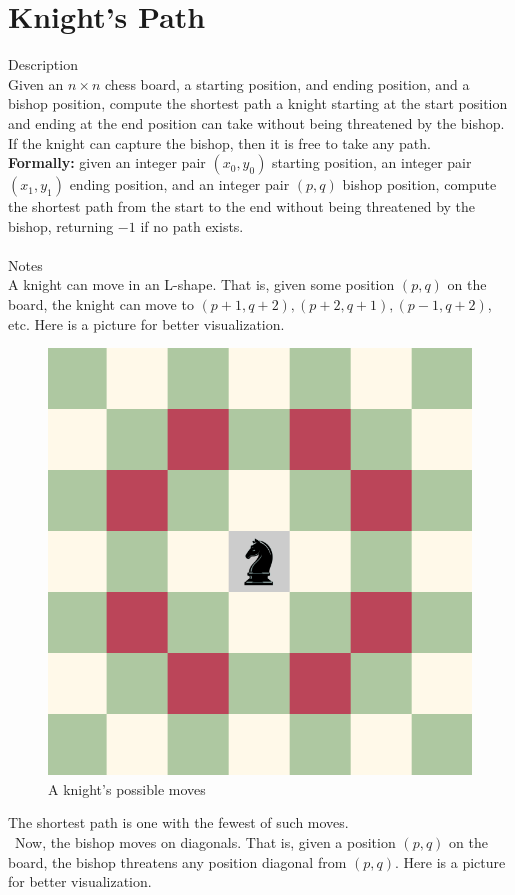 \documentclass[11pt]{exam}
\begin{document}
\section*{Knight's Path}

{\large Description}\\
Given an $n\times n$ chess board, a starting position, and ending position,
and a bishop position, compute the shortest path a knight starting at the
start position and ending at the end position can take without being
threatened by the bishop. If the knight can capture the bishop, then
it is free to take any path.\\
\textbf{Formally:} given an integer pair $(x_0,y_0)$ starting position, an integer pair $(x_1, y_1)$ ending position, and an integer pair $(p, q)$ bishop position, compute the shortest path from the start to the end without being threatened by the bishop, returning $-1$ if no path exists.\\\\
{\large Notes}\\
A knight can move in an L-shape. That is, given some position $(p,q)$ on
the board, the knight can move to $(p+1,q+2), (p+2,q+1), (p-1,q+2)$, etc.
Here is a picture for better visualization.
\begin{figure}[H]
	\centering
	\includegraphics[width=0.7\linewidth]{images/knight_moves.png}
	\caption{A knight's possible moves}
\end{figure}
The shortest path is one with the fewest of such moves.\\\
Now, the bishop moves on diagonals. That is, given a position $(p,q)$ on the board, the bishop threatens any position diagonal from $(p, q)$. Here is a picture for better visualization.
\end{document}
